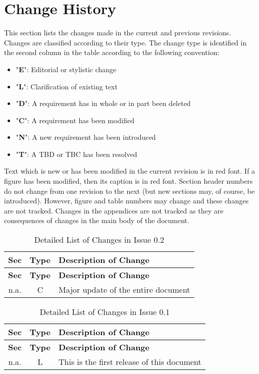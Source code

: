 \documentclass{pnp_article}
\begin{document}
\section{Change History}

This section lists the changes made in the current and previous revisions. Changes are classified according to their type. The change type is identified in the second column in the table according to the following convention:

\begin{itemize}
\item "\textbf{E}": Editorial or stylistic change
\item "\textbf{L}": Clarification of existing text
\item "\textbf{D}": A requirement has in whole or in part been deleted
\item "\textbf{C}": A requirement has been modified
\item "\textbf{N}": A new requirement has been introduced
\item "\textbf{T}": A TBD or TBC has been resolved
\end{itemize}

Text which is new or has been modified in the current revision is in red font. If a figure has been modified, then its caption is in red font. Section header numbers do not change from one revision to the next (but new sections may, of course, be introduced). However, figure and table numbers may change and these changes are not tracked. Changes in the appendices are not tracked as they are consequences of changes in the main body of the document.

\begin{longtable}{|c|c|p{10cm}|}
\caption{Detailed List of Changes in Issue 0.2} \\
\hline
\rowcolor{light-gray}
\textbf{Sec} & \textbf{Type} & \textbf{Description of Change} \\
\hline\hline
\endfirsthead
\rowcolor{light-gray}
\textbf{Sec} & \textbf{Type} & \textbf{Description of Change} \\
\hline\hline
\endhead
n.a. & C & Major update of the entire document \\
\hline
\end{longtable}

\begin{longtable}{|c|c|p{10cm}|}
\caption{Detailed List of Changes in Issue 0.1} \\
\hline
\rowcolor{light-gray}
\textbf{Sec} & \textbf{Type} & \textbf{Description of Change} \\
\hline\hline
\endfirsthead
\rowcolor{light-gray}
\textbf{Sec} & \textbf{Type} & \textbf{Description of Change} \\
\hline\hline
\endhead
n.a. & L & This is the first release of this document \\
\hline
\end{longtable}
\end{document}
